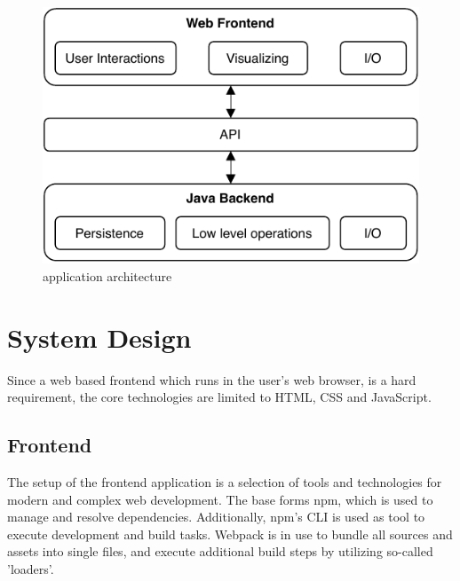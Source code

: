 \documentclass[a4paper,12pt,pdftex,halfparskip,cleardoubleempty,bibtotoc,liststotoc]{scrbook}
\begin{document}

\begin{figure}[H]
  \centering
  \vspace{0.8cm}
  \includegraphics[scale=0.8]{architecture}
  \caption{application architecture}
\end{figure}

\section{System Design}
Since a web based frontend which runs in the user's web browser, is a hard requirement, the core technologies are limited to HTML, CSS and JavaScript.


\subsection{Frontend}

The setup of the frontend application is a selection of tools and technologies for modern and complex web development.
The base forms npm, which is used to manage and resolve dependencies. Additionally, npm's CLI is used as tool to execute development and build tasks. Webpack is in use to bundle all sources and assets into single files, and execute additional build steps by utilizing so-called 'loaders'.
\end{document}
